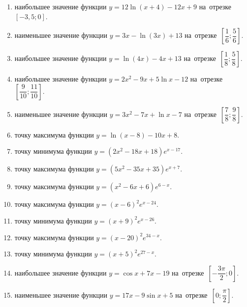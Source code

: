 \documentclass[a4paper,10pt]{article}
\begin{document}
\begin{enumerate}
\item {} наибольшее значение функции $y = 12\ln \left(x+4\right)-12x +9$ на~отрезке~$\left[-3,5;0\right]$.

\item {} наименьшее значение функции $y = 3x-\ln \left(3x\right)+13$ на~отрезке~$\left[\dfrac{1}{6};\dfrac{5}{6}\right]$.

\item {} наибольшее значение функции $y = \ln \left(4x\right)-4x+13$ на~отрезке~$\left[\dfrac{1}{8};\dfrac{5}{8}\right]$.

\item {} наибольшее значение функции $y=2x^2-9x+5\ln x-12$ на~отрезке~$\left[\dfrac{9}{10};\dfrac{11}{10}\right]$.

\item {} наименьшее значение функции $y=3x^2-7x+\ln x-7$ на~отрезке~$\left[\dfrac{7}{8};\dfrac{9}{8}\right]$.

\item {} точку максимума функции $y=\ln \left(x-8\right)-10x+8$.

\item {} точку минимума функции $y=\left(2x^2-18x+18\right)e^{x-17}$.

\item {} точку максимума функции $y=\left(5x^2-35x+35\right)e^{x+7}$.

\item {} точку максимума функции $y=\left(x^2-6x+6\right)e^{6-x}$.

\item {} точку максимума функции $y=\left(x -6\right)^2e^{x-24}$.

\item {} точку минимума функции $y=\left(x +9\right)^2e^{x-26}$.

\item {} точку максимума функции $y=\left(x -20\right)^2e^{34-x}$.

\item {} точку минимума функции $y=\left(x +5\right)^2e^{27-x}$.

\item {} наибольшее значение функции $y=\cos x+7x -19$ на~отрезке~$\left[-\dfrac{3\pi }{2};0\right]$.

\item {} наименьшее значение функции $y=17x-9\sin x +5$ на~отрезке~$\left[0;\dfrac{\pi }{2}\right]$.


\end{enumerate}
\end{document}
